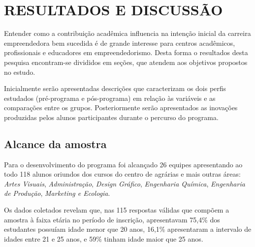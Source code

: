 \chapter{RESULTADOS E DISCUSSÃO }

Entender como a contribuição acadêmica influencia na intenção inicial da carreira empreendedora bem sucedida é de grande interesse para centros acadêmicos, profissionais e educadores em empreendedorismo. 
Desta forma o resultados desta pesquisa encontram-se divididos em seções, que atendem aos objetivos propostos no estudo. 

Inicialmente serão apresentadas descrições que caracterizam os dois perfis estudados (pré-programa  e pós-programa) em relação às variáveis e as comparações entre os grupos.
Posteriormente serão apresentados as inovações produzidas pelos alunos participantes durante o percurso do programa.

\section{Alcance da amostra}

Para o desenvolvimento do programa foi alcançado 26 equipes apresentando ao todo 118 alunos oriundos dos cursos do centro de agrárias e mais outras áreas: \textit{Artes Visuais}, \textit{Administração}, \textit{Design Gráfico}, \textit{Engenharia Química}, \textit{Engenharia de Produção}, \textit{Marketing e Ecologia}. 

Os dados coletados revelam que, nas 115 respostas válidas que compõem a amostra à faixa etária no período de inscrição, apresentavam 75,4\% dos estudantes possuíam idade menor que 20 anos,  16,1\% apresentaram a intervalo de idades entre 21 e 25 anos, e 59\% tinham idade maior que 25 anos.


